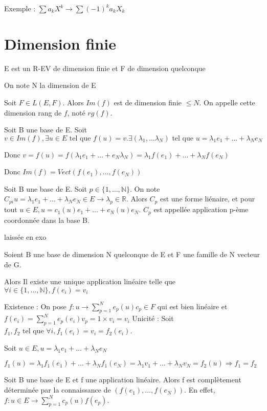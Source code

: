 \documentclass[french]{yLectureNote}
\newcommand{\N}[0]{\mathbb{N}}
\newcommand{\R}[0]{\mathbb{R}}
\newcommand{\tq}[0]{\text{ tel que }}
\begin{document}
Exemple : $\sum a_k X^k \to \sum (-1)^k a_k X_k$
\section{Dimension finie}
E est un R-EV de dimension finie et F de dimension quelconque

On note N la dimension de E

\begin{proposition}
Soit \(F\in L(E,F)\). Alors \(Im(f)\) est de dimension finie \(\leq N\). On appelle cette dimension rang de \(f\), noté \(rg(f)\).
\end{proposition}
\begin{myproof}
 Soit B une base de E. Soit $v\in Im(f), \exists u\in E \tq f(u)=v. \exists (\lambda_1,\dots\lambda_N) \tq u = \lambda_1e_1+\dots+\lambda_Ne_N$

 Donc $v = f(u) = f(\lambda_1e_1+\dots+e_N\lambda_N) = \lambda_1f(e_1)+\dots+\lambda_Nf(e_N)$

 Donc $Im(f) = Vect(f(e_1),\dots,f(e_N))$
\end{myproof}
\begin{definition}
Soit B une base de E. Soit \(p\in \{1,\dots,\N\}\). On note \(C_{pi}u = \lambda_1e_1+\dots+\lambda_Ne_N \in E \to \lambda_p\in \R\). Alors \(C_p\) est une forme liénaire, et pour tout \(u\in E, u = c_1(u)e_1+\dots+c_N(u)e_N\). \(C_p\) est appellée application p-ème coordonnée dans la base B.
\end{definition}
\begin{myproof}
 laissée en exo
\end{myproof}
\begin{theorem}[]
 Soient B une base de dimension N quelconque de E et F une famille de N vecteur de G.

 Alors Il existe une unique application linéaire telle que \(\forall i \in \{1,\dots,\N\}, f(e_i) = v_i\)
\end{theorem}
\begin{myproof}
 Existence : On pose $f:u\to \sum^{N}_{p=1}e_p(u)c_p \in F$ qui est bien linéaire et $f(e_i)=\sum^{N}_{p=1}e_p(e_i)v_p = 1\times v_i = v_i$
 Unicité : Soit $f_1,f_2 \tq \forall i,f_1(e_i)=v_i=f_2(e_i)$.

 Soit $u\in E, u= \lambda_1e_1+\dots+\lambda_Ne_N$

 $f_1(u) = \lambda_1f_1(e_1)+\dots+\lambda_Nf_1(e_N) = \lambda_1v_1+\dots+\lambda_Nv_N = f_2(u) \Rightarrow f_1=f_2$
\end{myproof}
\begin{proposition}[Corollaire]
Soit B une base de E et f une application linéaire. Alors f est complètement déterminée par la connaissance de \((f(e_1),\dots,f(e_N))\). En effet, \(f : u\in E \to \sum_{p=1}^N c_p(u)f(e_p)\).
\end{proposition}
\end{document}
